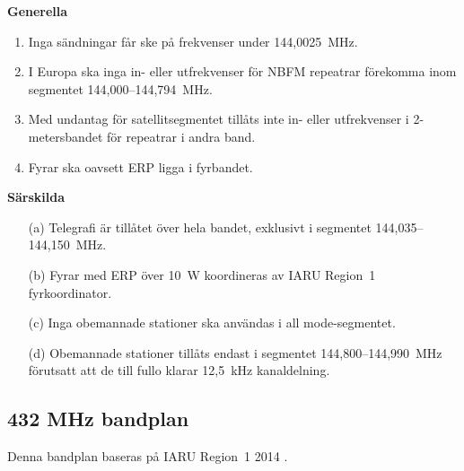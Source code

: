 \textbf{Generella}
\begin{enumerate}[label=\alph*.]
\item Inga sändningar får ske på frekvenser under 144,0025~MHz.
\item I Europa ska inga in- eller utfrekvenser för NBFM repeatrar
  förekomma inom segmentet 144,000--144,794~MHz.
\item Med undantag för satellitsegmentet tillåts inte in- eller
  utfrekvenser i 2-metersbandet för repeatrar i andra band.
\item Fyrar ska oavsett ERP ligga i fyrbandet.
\end{enumerate}

\textbf{Särskilda}
\begin{itemize}
\item[(a)] Telegrafi är tillåtet över hela bandet, exklusivt i segmentet
  144,035--144,150~MHz.
\item[(b)] Fyrar med ERP över 10~W koordineras av IARU Region~1 fyrkoordinator.
\item[(c)] Inga obemannade stationer ska användas i all mode-segmentet.
\item[(d)] Obemannade stationer tillåts endast i segmentet 144,800--144,990~MHz
förutsatt att de till fullo klarar 12,5~kHz kanaldelning.
\end{itemize}

\subsection{432 MHz bandplan}
\label{432MHzbandplan}
Denna bandplan baseras på IARU Region~1 2014 \cite{IARU1}.

